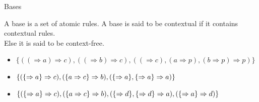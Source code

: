 \documentclass{beamer}
\begin{document}
\begin{frame}{Bases}
	\begin{definition}[Base]
		A base is a set of atomic rules.\newline
		\pause
		A base is said to be contextual if it contains contextual rules.\\
		Else it is said to be context-free.
	\end{definition}
	\pause
	\begin{itemize}
		\item $\{((\Rightarrow a) \Rightarrow c), ((\Rightarrow b) \Rightarrow c), ((\Rightarrow c), (a \Rightarrow p), (b\Rightarrow p)\Rightarrow p)\}$
		\item $\{(\{ \Rightarrow a\}\Rightarrow c), (\{ a\Rightarrow c\}\Rightarrow b),(\{\Rightarrow a\},\{\Rightarrow a\}\Rightarrow a)\}$
		\item $\{(\{ \Rightarrow a\}\Rightarrow c), (\{ a\Rightarrow c\}\Rightarrow b),(\{\Rightarrow d\},\{\Rightarrow d\}\Rightarrow a),(\{\Rightarrow a\}\Rightarrow d)\}$
	\end{itemize}
\end{frame}
\end{document}
